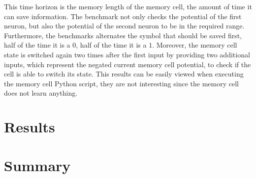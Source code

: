 \documentclass[draft,final]{vutinfth} %
\begin{document}
    This time horizon is the memory length of the memory cell, the amount of time it can save information.
    The benchmark not only checks the potential of the first neuron, but also the potential of the second neuron to be in the required range.
    Furthermore, the benchmarks alternates the symbol that should be saved first, half of the time it is a $0$, half of the time it is a $1$.
    Moreover, the memory cell state is switched again two times after the first input by providing two additional inputs, which represent the negated current memory cell potential, to check if the cell is able to switch its state.
    This results can be easily viewed when executing the memory cell Python script, they are not interesting since the memory cell does not learn anything.

    \chapter{Results}

    \chapter{Summary}


    \backmatter

    \listoffigures %

    \cleardoublepage %
    \listoftables %


    \printindex

    \printglossaries

    
    
\end{document}
